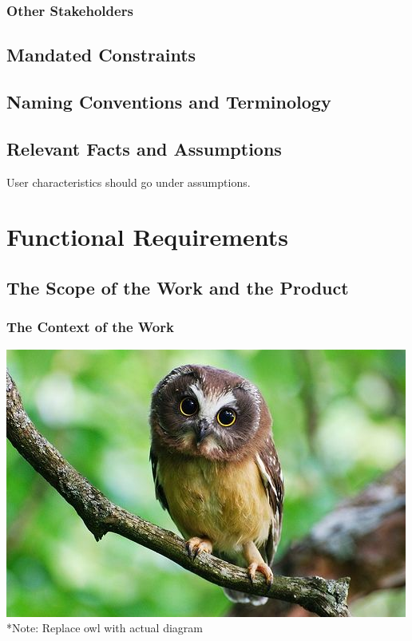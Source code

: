 \documentclass[12pt, titlepage]{article}
\begin{document}
\subsubsection{Other Stakeholders}

\subsection{Mandated Constraints}

\subsection{Naming Conventions and Terminology}

\subsection{Relevant Facts and Assumptions}

User characteristics should go under assumptions.

\section{Functional Requirements}

\subsection{The Scope of the Work and the Product}

\subsubsection{The Context of the Work}

	\includegraphics[width=\linewidth]{images/owl.jpg}
	*Note: Replace owl with actual diagram
\end{document}
